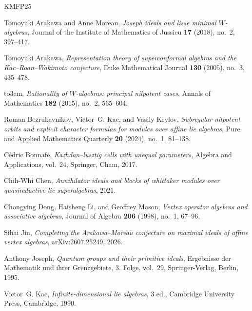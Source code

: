 \documentclass[11pt]{amsart}
\theoremstyle{remark}
\numberwithin{equation}{section}
\begin{document}
\providecommand{\bysame}{\leavevmode\hbox to3em{\hrulefill}\thinspace}
\providecommand{\MR}{\relax\ifhmode\unskip\space\fi MR }
\providecommand{\MRhref}[2]{%
  \href{http://www.ams.org/mathscinet-getitem?mr=#1}{#2}
}
\providecommand{\href}[2]{#2}
\begin{thebibliography}{KMFP25}

Tomoyuki Arakawa and Anne Moreau, \emph{Joseph ideals and lisse minimal
  {$W$}-algebras}, Journal of the Institute of Mathematics of Jussieu
  \textbf{17} (2018), no.~2, 397--417.

Tomoyuki Arakawa, \emph{Representation theory of superconformal algebras and
  the {Kac--Roan--Wakimoto} conjecture}, Duke Mathematical Journal \textbf{130}
  (2005), no.~3, 435--478.

\bysame, \emph{Rationality of {$W$}-algebras: principal nilpotent cases},
  Annals of Mathematics \textbf{182} (2015), no.~2, 565--604.

Roman Bezrukavnikov, Victor~G. Kac, and Vasily Krylov, \emph{Subregular
  nilpotent orbits and explicit character formulas for modules over affine lie
  algebras}, Pure and Applied Mathematics Quarterly \textbf{20} (2024), no.~1,
  81--138.

C{\'e}dric Bonnaf{\'e}, \emph{Kazhdan--lusztig cells with unequal parameters},
  Algebra and Applications, vol.~24, Springer, Cham, 2017.

Chih-Whi Chen, \emph{Annihilator ideals and blocks of whittaker modules over
  quasireductive lie superalgebras}, 2021.

Chongying Dong, Haisheng Li, and Geoffrey Mason, \emph{Vertex operator algebras
  and associative algebras}, Journal of Algebra \textbf{206} (1998), no.~1,
  67--96.

Sihai Jin, \emph{Completing the {Arakawa--Moreau} conjecture on maximal ideals
  of affine vertex algebras}, arXiv:2607.25249, 2026.

Anthony Joseph, \emph{Quantum groups and their primitive ideals}, Ergebnisse
  der Mathematik und ihrer Grenzgebiete, 3. Folge, vol.~29, Springer-Verlag,
  Berlin, 1995.

Victor~G. Kac, \emph{Infinite-dimensional lie algebras}, 3 ed., Cambridge
  University Press, Cambridge, 1990.


\end{thebibliography}
\end{document}
